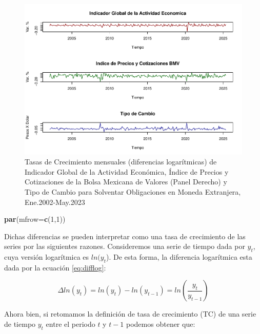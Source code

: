 \documentclass[
]{book}
\newenvironment{Shaded}{\begin{snugshade}}{\end{snugshade}}
\newcommand{\AttributeTok}[1]{\textcolor[rgb]{0.13,0.29,0.53}{#1}}
\newcommand{\DecValTok}[1]{\textcolor[rgb]{0.00,0.00,0.81}{#1}}
\newcommand{\FunctionTok}[1]{\textcolor[rgb]{0.13,0.29,0.53}{\textbf{#1}}}
\newcommand{\NormalTok}[1]{#1}
\begin{document}
\begin{figure}

{\centering \includegraphics{Notas-Series-Tiempo_files/figure-latex/fig5-1} 

}

\caption{Tasas de Crecimiento mensuales (diferencias logarítmicas) de Indicador Global de la Actividad Económica, Índice de Precios y Cotizaciones de la Bolsa Mexicana de Valores (Panel Derecho) y Tipo de Cambio para Solventar Obligaciones en Moneda Extranjera, Ene.2002-May.2023}\label{fig:fig5}
\end{figure}

\begin{Shaded}
\begin{Highlighting}[]
\FunctionTok{par}\NormalTok{(}\AttributeTok{mfrow=}\FunctionTok{c}\NormalTok{(}\DecValTok{1}\NormalTok{,}\DecValTok{1}\NormalTok{))}
\end{Highlighting}
\end{Shaded}

Dichas diferencias se pueden interpretar como una tasa de crecimiento de las series por las siguientes razones. Consideremos una serie de tiempo dada por \(y_t\), cuya versión logarítmica es \(ln(y_t\)). De esta forma, la diferencia logarítmica esta dada por la ecuación \eqref{eq:difflog}:

\begin{equation}
   \Delta ln(y_t) = ln(y_t) - ln(y_{t-1}) = ln \left( \frac{y_t}{y_{t-1}} \right)
   \label{eq:difflog}
\end{equation}

Ahora bien, si retomamos la definición de tasa de crecimiento (TC) de una serie de tiempo \(y_t\) entre el periodo \(t\) y \(t-1\) podemos obtener que:
\end{document}
